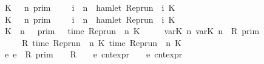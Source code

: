 \begin{isabellebody}
{\isacharbar}\ {\isacartoucheopen}{\isasymlbrakk}\ K\ {\isasymnot}{\isasymUp}\ {\isacharless}\ n\ {\isasymrbrakk}\isactrlsub p\isactrlsub r\isactrlsub i\isactrlsub m\ \ \ {\isacharequal}\ {\isacharbraceleft}{\isasymrho}{\isachardot}\ {\isasymforall}i\ {\isacharless}\ n{\isachardot}\ {\isasymnot}\ hamlet\ {\isacharparenleft}{\isacharparenleft}Rep{\isacharunderscore}run\ {\isasymrho}{\isacharparenright}\ i\ K{\isacharparenright}{\isacharbraceright}{\isacartoucheclose}\isanewline
{\isacharbar}\ {\isacartoucheopen}{\isasymlbrakk}\ K\ {\isasymnot}{\isasymUp}\ {\isasymge}\ n\ {\isasymrbrakk}\isactrlsub p\isactrlsub r\isactrlsub i\isactrlsub m\ \ \ {\isacharequal}\ {\isacharbraceleft}{\isasymrho}{\isachardot}\ {\isasymforall}i\ {\isasymge}\ n{\isachardot}\ {\isasymnot}\ hamlet\ {\isacharparenleft}{\isacharparenleft}Rep{\isacharunderscore}run\ {\isasymrho}{\isacharparenright}\ i\ K{\isacharparenright}\ {\isacharbraceright}{\isacartoucheclose}\isanewline
{\isacharbar}\ {\isacartoucheopen}{\isasymlbrakk}\ K\ {\isasymDown}\ n\ {\isacharat}\ {\isasymtau}\ {\isasymrbrakk}\isactrlsub p\isactrlsub r\isactrlsub i\isactrlsub m\ {\isacharequal}\ {\isacharbraceleft}{\isasymrho}{\isachardot}\ time\ {\isacharparenleft}{\isacharparenleft}Rep{\isacharunderscore}run\ {\isasymrho}{\isacharparenright}\ n\ K{\isacharparenright}\ {\isacharequal}\ {\isasymtau}\ {\isacharbraceright}{\isacartoucheclose}\isanewline
{\isacharbar}\ {\isacartoucheopen}{\isasymlbrakk}\ {\isasymlfloor}{\isasymtau}\isactrlsub v\isactrlsub a\isactrlsub r{\isacharparenleft}K\ n\ {\isasymtau}\isactrlsub v\isactrlsub a\isactrlsub r{\isacharparenleft}K\ n\ {\isasymin}\ R\ {\isasymrbrakk}\isactrlsub p\isactrlsub r\isactrlsub i\isactrlsub m\ {\isacharequal}\isanewline
\ \ \ \ {\isacharbraceleft}\ {\isasymrho}{\isachardot}\ R\ {\isacharparenleft}time\ {\isacharparenleft}{\isacharparenleft}Rep{\isacharunderscore}run\ {\isasymrho}{\isacharparenright}\ n\ K\ time\ {\isacharparenleft}{\isacharparenleft}Rep{\isacharunderscore}run\ {\isasymrho}{\isacharparenright}\ n\ K\ {\isacharbraceright}{\isacartoucheclose}\isanewline
{\isacharbar}\ {\isacartoucheopen}{\isasymlbrakk}\ {\isasymlceil}e\ e\ {\isasymin}\ R\ {\isasymrbrakk}\isactrlsub p\isactrlsub r\isactrlsub i\isactrlsub m\ {\isacharequal}\ {\isacharbraceleft}\ {\isasymrho}{\isachardot}\ R\ {\isacharparenleft}{\isasymlbrakk}\ {\isasymrho}\ {\isasymturnstile}\ e\ {\isasymrbrakk}\isactrlsub c\isactrlsub n\isactrlsub t\isactrlsub e\isactrlsub x\isactrlsub p\isactrlsub r{\isacharcomma}\ {\isasymlbrakk}\ {\isasymrho}\ {\isasymturnstile}\ e\ {\isasymrbrakk}\isactrlsub c\isactrlsub n\isactrlsub t\isactrlsub e\isactrlsub x\isactrlsub p\isactrlsub r{\isacharparenright}\ {\isacharbraceright}{\isacartoucheclose}\isanewline

\end{isabellebody}
